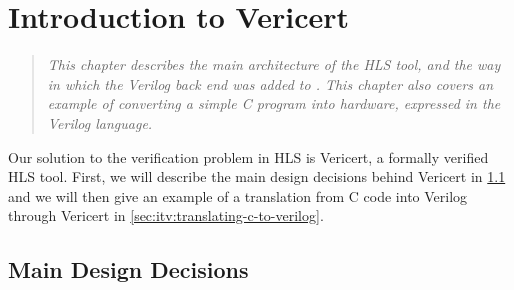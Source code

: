 \chapter{Introduction to Vericert}%
\label{sec:introduction-to-vericert}

\begin{quote}\itshape
  This chapter describes the main architecture of the HLS tool, and the way in
  which the Verilog back end was added to \compcert{}.  This chapter also covers
  an example of converting a simple C program into hardware, expressed in the
  Verilog language.
\end{quote}

\noindent Our solution to the verification problem in \gls{HLS} is Vericert, a
formally verified \gls{HLS} tool.  First, we will describe the main design
decisions behind Vericert in \cref{sec:itv:main-design-decisions} and we will
then give an example of a translation from C code into Verilog through Vericert
in \cref{sec:itv:translating-c-to-verilog}.

\section{Main Design Decisions}%
\label{sec:itv:main-design-decisions}

